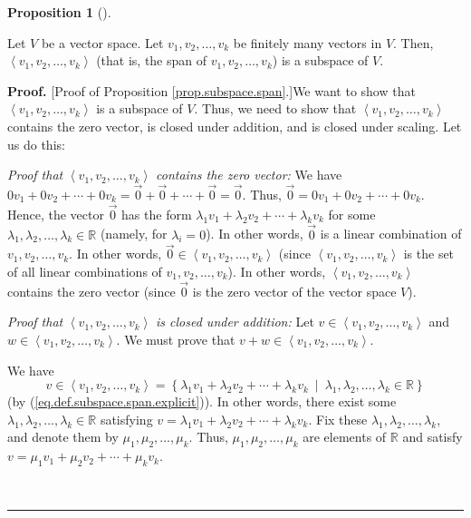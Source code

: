 \documentclass[numbers=enddot,12pt,final,onecolumn,notitlepage]{scrartcl}%
\theoremstyle{definition}
\newtheorem{prop}[theo]{Proposition}
\newenvironment{proposition}[1][]
{\begin{prop}[#1]\begin{leftbar}}
{\end{leftbar}\end{prop}}
\newenvironment{proof}[1][Proof]{\noindent\textbf{#1.} }{\ \rule{0.5em}{0.5em}}
\begin{document}
\begin{proposition}
\label{prop.subspace.span}Let $V$ be a vector space. Let $v_{1},v_{2}%
,\ldots,v_{k}$ be finitely many vectors in $V$. Then, $\left\langle
v_{1},v_{2},\ldots,v_{k}\right\rangle $ (that is, the span of $v_{1}%
,v_{2},\ldots,v_{k}$) is a subspace of $V$.
\end{proposition}

\begin{proof}
[Proof of Proposition \ref{prop.subspace.span}.]We want to show that
$\left\langle v_{1},v_{2},\ldots,v_{k}\right\rangle $ is a subspace of $V$.
Thus, we need to show that $\left\langle v_{1},v_{2},\ldots,v_{k}\right\rangle
$ contains the zero vector, is closed under addition, and is closed under
scaling. Let us do this:

\textit{Proof that }$\left\langle v_{1},v_{2},\ldots,v_{k}\right\rangle
$\textit{ contains the zero vector:} We have $0v_{1}+0v_{2}+\cdots
+0v_{k}=\overrightarrow{0}+\overrightarrow{0}+\cdots+\overrightarrow{0}%
=\overrightarrow{0}$. Thus, $\overrightarrow{0}=0v_{1}+0v_{2}+\cdots+0v_{k}$.
Hence, the vector $\overrightarrow{0}$ has the form $\lambda_{1}v_{1}%
+\lambda_{2}v_{2}+\cdots+\lambda_{k}v_{k}$ for some $\lambda_{1},\lambda
_{2},\ldots,\lambda_{k}\in\mathbb{R}$ (namely, for $\lambda_{i}=0$). In other
words, $\overrightarrow{0}$ is a linear combination of $v_{1},v_{2}%
,\ldots,v_{k}$. In other words, $\overrightarrow{0}\in\left\langle v_{1}%
,v_{2},\ldots,v_{k}\right\rangle $ (since $\left\langle v_{1},v_{2}%
,\ldots,v_{k}\right\rangle $ is the set of all linear combinations of
$v_{1},v_{2},\ldots,v_{k}$). In other words, $\left\langle v_{1},v_{2}%
,\ldots,v_{k}\right\rangle $ contains the zero vector (since
$\overrightarrow{0}$ is the zero vector of the vector space $V$).

\textit{Proof that }$\left\langle v_{1},v_{2},\ldots,v_{k}\right\rangle $
\textit{is closed under addition:} Let $v\in\left\langle v_{1},v_{2}%
,\ldots,v_{k}\right\rangle $ and $w\in\left\langle v_{1},v_{2},\ldots
,v_{k}\right\rangle $. We must prove that $v+w\in\left\langle v_{1}%
,v_{2},\ldots,v_{k}\right\rangle $.

We have
\[
v\in\left\langle v_{1},v_{2},\ldots,v_{k}\right\rangle =\left\{  \lambda
_{1}v_{1}+\lambda_{2}v_{2}+\cdots+\lambda_{k}v_{k}\ \mid\ \lambda_{1}%
,\lambda_{2},\ldots,\lambda_{k}\in\mathbb{R}\right\}
\]
(by (\ref{eq.def.subspace.span.explicit})). In other words, there exist some
$\lambda_{1},\lambda_{2},\ldots,\lambda_{k}\in\mathbb{R}$ satisfying
$v=\lambda_{1}v_{1}+\lambda_{2}v_{2}+\cdots+\lambda_{k}v_{k}$. Fix these
$\lambda_{1},\lambda_{2},\ldots,\lambda_{k}$, and denote them by $\mu_{1}%
,\mu_{2},\ldots,\mu_{k}$. Thus, $\mu_{1},\mu_{2},\ldots,\mu_{k}$ are elements
of $\mathbb{R}$ and satisfy $v=\mu_{1}v_{1}+\mu_{2}v_{2}+\cdots+\mu_{k}v_{k}$.


\end{proof}
\end{document}
